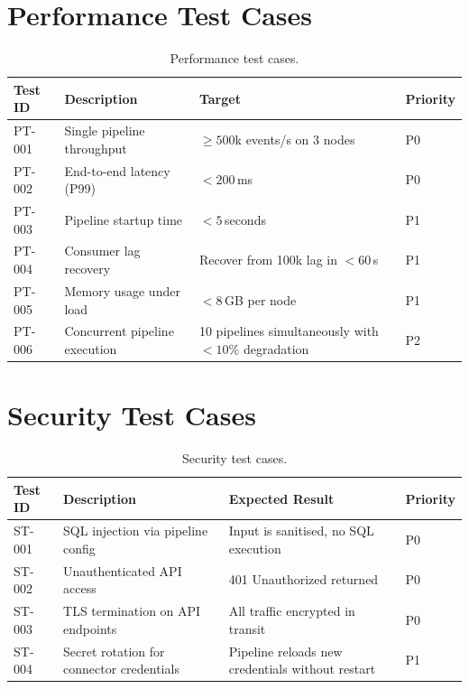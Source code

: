 \documentclass[
    language=english,
    doctype=technical-report,
    institution=none,
    titlestyle=book,
    oneside,
]{../../omnilatex}
\begin{document}
\section{Performance Test Cases}

\begin{table}[htbp]
    \centering
    \caption{Performance test cases.}
    \label{tab:perf-tests}
    \begin{tabular}{@{}p{2.5cm}p{4cm}p{3.5cm}p{2cm}@{}}
        \toprule
        Test ID & Description & Target & Priority \\
        \midrule
        PT-001 & Single pipeline throughput &
            $\geq 500$k events/s on 3 nodes & P0 \\
        PT-002 & End-to-end latency (P99) & $< 200$\,ms & P0 \\
        PT-003 & Pipeline startup time & $< 5$\,seconds & P1 \\
        PT-004 & Consumer lag recovery & Recover from 100k lag
            in $< 60$\,s & P1 \\
        PT-005 & Memory usage under load & $< 8$\,GB per node &
            P1 \\
        PT-006 & Concurrent pipeline execution &
            10 pipelines simultaneously with $< 10\%$ degradation & P2 \\
        \bottomrule
    \end{tabular}
\end{table}

\section{Security Test Cases}

\begin{table}[htbp]
    \centering
    \caption{Security test cases.}
    \label{tab:sec-tests}
    \begin{tabular}{@{}p{2.5cm}p{6cm}p{3cm}p{1.5cm}@{}}
        \toprule
        Test ID & Description & Expected Result & Priority \\
        \midrule
        ST-001 & SQL injection via pipeline config &
            Input is sanitised, no SQL execution & P0 \\
        ST-002 & Unauthenticated API access &
            401 Unauthorized returned & P0 \\
        ST-003 & TLS termination on API endpoints &
            All traffic encrypted in transit & P0 \\
        ST-004 & Secret rotation for connector credentials &
            Pipeline reloads new credentials without restart & P1 \\
        \bottomrule
    \end{tabular}
\end{table}
\end{document}
